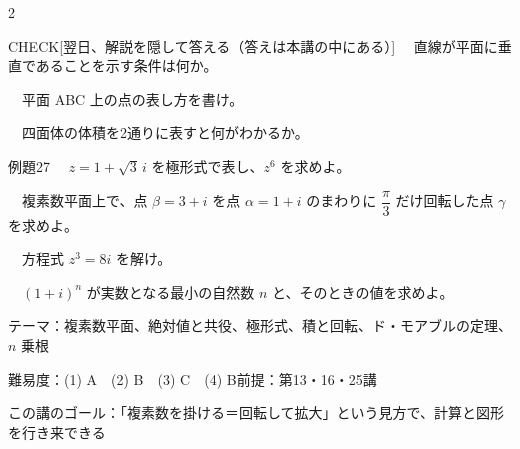 \documentclass[paper=b5j, fontsize=8pt, fleqn, twoside]{jlreq}
\begin{document}
\begin{multicols*}{2}
  \begin{ptbs}{CHECK}[翌日、解説を隠して答える（答えは本講の中にある）]
    　直線が平面に垂直であることを示す条件は何か。\par
    　平面 ABC 上の点の表し方を書け。\par
    　四面体の体積を2通りに表すと何がわかるか。
  \end{ptbs}

  \notefill
\end{multicols*}
\begin{ascolorbox4A}[出典：オリジナル]{例題27}
  　$z=1+\sqrt3\,i$ を極形式で表し、$z^6$ を求めよ。\par
  　複素数平面上で、点 $\beta=3+i$ を点 $\alpha=1+i$ のまわりに $\dfrac\pi3$ だけ回転した点 $\gamma$ を求めよ。\par
  　方程式 $z^3=8i$ を解け。\par
  　$(1+i)^n$ が実数となる最小の自然数 $n$ と、そのときの値を求めよ。
\end{ascolorbox4A}

\begin{Data}
  テーマ：複素数平面、絶対値と共役、極形式、積と回転、ド・モアブルの定理、$n$ 乗根\par
  難易度：(1) A　(2) B　(3) C　(4) B\quad 前提：第13・16・25講\par
  この講のゴール：「複素数を掛ける＝回転して拡大」という見方で、計算と図形を行き来できる
\end{Data}
\end{document}
